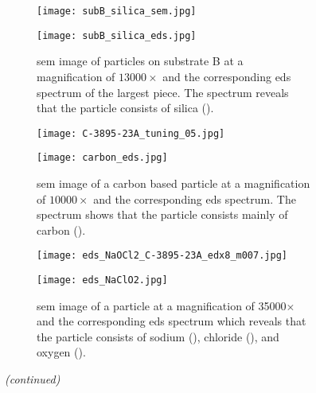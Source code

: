 \begin{figure}[htbp]
\ContinuedFloat
    \centering
    \begin{subfigure}[t]{\textwidth}
          \begin{minipage}[t]{0.49\linewidth}
            \centering
            \texttt{[image: subB\_silica\_sem.jpg]}
          \end{minipage}
          \hfill
          \begin{minipage}[t]{0.49\linewidth}
            \centering
            \texttt{[image: subB\_silica\_eds.jpg]}
          \end{minipage}
        \caption{\Ac{sem} image of particles on substrate B at a magnification of $13000\times$ and the corresponding \ac{eds} spectrum of the largest piece. The spectrum reveals that the particle consists of silica ().}\label{fig:subBa_polishing-grit_silica}
    \end{subfigure}%
    \par\bigskip
    \begin{subfigure}[t]{\textwidth}
          \begin{minipage}[t]{0.49\linewidth}
            \centering
            \texttt{[image: C-3895-23A\_tuning\_05.jpg]}%
          \end{minipage}
          \hfill
          \begin{minipage}[t]{0.49\linewidth}
            \centering
            \texttt{[image: carbon\_eds.jpg]}
          \end{minipage}
        \caption{\Ac{sem} image of a carbon based particle at a magnification of $10000\times$ and the corresponding \ac{eds} spectrum. The spectrum shows that the particle consists mainly of carbon ().}\label{fig:subBa_particle_carbon}
    \end{subfigure}%
    \par\bigskip
    \begin{subfigure}[t]{\textwidth}
          \begin{minipage}[t]{0.49\linewidth}
            \centering
            \texttt{[image: eds\_NaOCl2\_C-3895-23A\_edx8\_m007.jpg]}
          \end{minipage}
          \hfill
          \begin{minipage}[t]{0.49\linewidth}
            \centering
            \texttt{[image: eds\_NaClO2.jpg]}
          \end{minipage}
    \caption{\Ac{sem} image of a  particle at a magnification of 35000$\times$ and the corresponding \ac{eds} spectrum which reveals that the particle consists of sodium (), chloride (), and oxygen ().}\label{fig:EDS_NaClO}
    \end{subfigure}%
    \captionsetup{list=no}
    \caption{\emph{(continued)}}
\end{figure}
